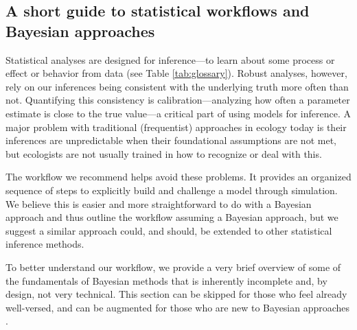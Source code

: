 \documentclass[11pt]{article}
\begin{document}
\subsection*{A short guide to statistical workflows and Bayesian approaches}
Statistical analyses are designed for inference---to learn about some process or effect or behavior from data  (see Table \ref{tab:glossary}). Robust analyses, however, rely on our inferences being consistent with the underlying truth more often than not.  Quantifying this consistency is calibration---analyzing how often a parameter estimate is close to the true value---a critical part of using models for inference. A major problem with traditional (frequentist) approaches in ecology today is their inferences are unpredictable when their foundational assumptions are not met, but ecologists are not usually trained in how to recognize or deal with this.

The workflow we recommend helps avoid these problems. It provides an organized sequence of steps to explicitly build and challenge a model through simulation. We believe this is easier and more straightforward to do with a Bayesian approach and thus outline the workflow assuming a Bayesian approach, but we suggest a similar approach could, and should, be extended to other statistical inference methods. %

To better understand our workflow, we provide a very brief overview of some of the fundamentals of Bayesian methods that is inherently incomplete and, by design, not very technical. This section can be skipped for those who feel already well-versed, and can be augmented for those who are new to Bayesian approaches \citep[for example,][]{statrethink,BDA,regotherstories}.
\end{document}
